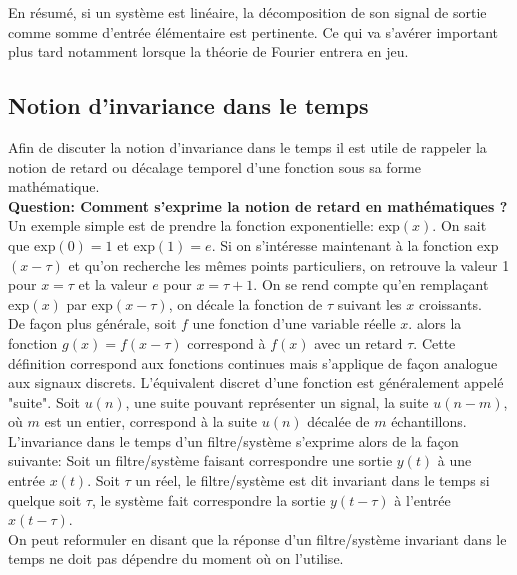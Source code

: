 \documentclass[11pt,a4paper]{article}
\begin{document}
En résumé, si un système est linéaire, la décomposition de son signal de sortie comme somme d'entrée élémentaire est pertinente. Ce qui va s'avérer important plus tard notamment lorsque la théorie de Fourier entrera en jeu.

\subsection{Notion d'invariance dans le temps}
Afin de discuter la notion d'invariance dans le temps il est utile de rappeler la notion de retard ou décalage temporel d'une fonction sous sa forme mathématique.\\

\textbf{Question: Comment s'exprime la notion de retard en mathématiques ?}\\

Un exemple simple est de prendre la fonction exponentielle: exp$(x)$. On sait que exp$(0) = 1$ et exp$(1) = e$. Si on s'intéresse maintenant à la fonction exp$(x-\tau)$ et qu'on recherche les mêmes points particuliers, on retrouve la valeur 1 pour $x = \tau$ et la valeur $e$ pour $x= \tau + 1$. On se rend compte qu'en remplaçant exp$(x)$ par exp$(x-\tau)$, on décale la fonction de $\tau$ suivant les $x$ croissants.  \\

De façon plus générale, soit $f$ une fonction d'une variable réelle $x$. alors la fonction $g(x) = f(x-\tau)$ correspond à $f(x)$ avec un retard $\tau$. Cette définition correspond aux fonctions continues mais s'applique de façon analogue aux signaux discrets. L'équivalent discret d'une fonction est généralement appelé "suite". Soit $u(n)$, une suite pouvant représenter un signal, la suite $u(n-m)$, où $m$ est un entier, correspond à la suite $u(n)$ décalée de $m$ échantillons. \\

L'invariance dans le temps d'un filtre/système s'exprime alors de la façon suivante: Soit un filtre/système faisant correspondre une sortie $y(t)$ à une entrée $x(t)$. Soit $\tau$ un réel, le filtre/système est dit invariant dans le temps si quelque soit $\tau$, le système fait correspondre la sortie $y(t-\tau)$ à l'entrée $x(t-\tau)$.\\

On peut reformuler en disant que la réponse d'un filtre/système invariant dans le temps ne doit pas dépendre du moment où on l'utilise.\\
\end{document}
